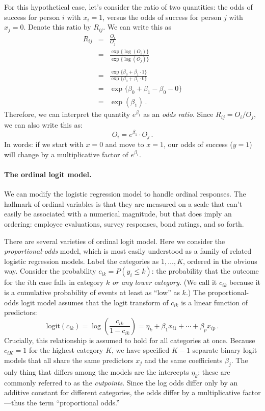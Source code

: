 \documentclass[11pt]{article}
\newcommand{\1}[1]{\mathbf{1}_{\{ {#1} \}}}
\begin{document}
For this hypothetical case, let's consider the ratio of two quantities: the odds of success for person $i$ with $x_i = 1$, versus the odds of success for person $j$ with $x_j = 0$.  Denote this ratio by $R_{ij}$.  We can write this as
\begin{eqnarray*}
R_{ij} &=& \frac{O_i}{O_j} \\
&=& \frac{ \exp\{ \log(O_i) \} } { \exp\{ \log(O_j) \} } \\
\\
&=&  \frac{ \exp\{ \beta_0 + \beta_1 \cdot 1 \} } { \exp\{ \beta_0 + \beta_1 \cdot 0 \} } \\
&=& \exp\{ \beta_0 + \beta_1 - \beta_0 - 0 \} \\
&=& \exp (\beta_1) \, .
\end{eqnarray*}
Therefore, we can interpret the quantity $e^{\beta_1}$ as an \textit{odds ratio}.  Since $R_{ij} = O_i / O_j$, we can also write this as:
$$
O_i = e^{\beta_1} \cdot O_j \, .
$$
In words: if we start with $x = 0$ and move to $x=1$, our odds of success ($y=1$) will change by a multiplicative factor of $e^{\beta_1}$.


\paragraph{The ordinal logit model.}

We can modify the logistic regression model to handle ordinal responses.  The hallmark of ordinal variables is that they are measured on a scale that can't easily be associated with a numerical magnitude, but that does imply an ordering: employee evaluations, survey responses, bond ratings, and so forth.

There are several varieties of ordinal logit model.  Here we consider the \textit{proportional-odds} model, which is most easily understood as a family of related logistic regression models.  Label the categories as $1, \ldots, K$, ordered in the obvious way.  Consider the probability $c_{ik} = P(y_i \leq k)$: the probability that the outcome for the $i$th case falls in category $k$ \textit{or any lower category.}  (We call it $c_{ik}$ because it is a cumulative probability of events at least as ``low'' as $k$.)  The proportional-odds logit model assumes that the logit transform of $c_{ik}$ is a linear function of predictors:
$$
\mbox{logit}(c_{ik}) = \log \left( \frac{c_{ik}}{1-c_{ik}} \right) = \eta_k + \beta_1 x_{i1} + \cdots + \beta_p x_{ip} \, .
$$
Crucially, this relationship is assumed to hold for all categories at once.  Because $c_{iK} = 1$ for the highest category $K$, we have specified $K-1$ separate binary logit models that all share the same predictors $x_j$ and the same coefficients $\beta_j$.   The only thing that differs among the models are the intercepts $\eta_k$; these are commonly referred to as the \textit{cutpoints}.  Since the log odds differ only by an additive constant for different categories, the odds differ by a multiplicative factor---thus the term ``proportional odds.''
\end{document}
